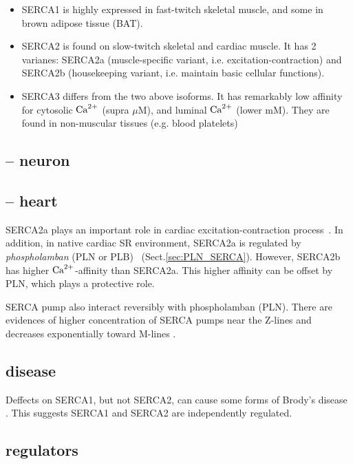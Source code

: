 \begin{framed}
  \begin{itemize}
  \item SERCA1 is highly expressed in fast-twitch skeletal muscle, and some in
  brown adipose tissue (BAT).
  \item SERCA2 is found on slow-twitch skeletal and cardiac muscle. It has 2
  varianes:  SERCA2a (muscle-specific variant, i.e. excitation-contraction)
  and SERCA2b (housekeeping variant, i.e. maintain basic cellular
    functions).     
  \item SERCA3 differs from the two above isoforms. It has remarkably
    low affinity for cytosolic ${\text{Ca}^{2+}}$ (supra $\mu$M), and luminal ${\text{Ca}^{2+}}$
    (lower mM). They are found in non-muscular tissues (e.g. blood platelets)
  \end{itemize}
\end{framed}

\subsection{-- neuron}


\subsection{-- heart}


SERCA2a plays an important role in cardiac excitation-contraction
process~\citep{Vangheluwe2006,Periasamy2008}. In addition, in native cardiac SR
environment, SERCA2a is regulated by {\it phospholamban} (PLN or
PLB)~\citep{MacLennan2003} (Sect.\ref{sec:PLN_SERCA}). However, SERCA2b has
higher ${\text{Ca}^{2+}}$-affinity than SERCA2a. This higher affinity can be offset by PLN,
which plays a protective role.

SERCA pump also interact reversibly with phospholamban (PLN). There are
evidences of higher concentration of SERCA pumps near the Z-lines and decreases
exponentially toward M-lines \citep{smith1998}.

\subsection{disease}

Deffects on SERCA1, but not SERCA2, can cause some forms of Brody's disease
\citep{MacLennan2000}. This suggests SERCA1 and SERCA2 are independently
regulated.


\subsection{regulators}

